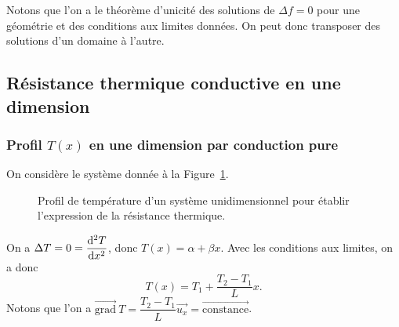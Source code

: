         Notons que l'on a le théorème d'unicité des solutions de $\Delta f=0$ pour une géométrie et des conditions aux limites données. On peut donc transposer des solutions d'un domaine à l'autre.

    \subsection{Résistance thermique conductive en une dimension}
        \subsubsection{Profil $T(x)$ en une dimension par conduction pure}

            On considère le système donnée à la Figure~\ref{fig:resistance_thermique_conductive_1d}.
            \begin{figure}
                \centering
                \caption{Profil de température d'un système unidimensionnel pour établir l'expression de la résistance thermique.}    
                \label{fig:resistance_thermique_conductive_1d}
            \end{figure}

            On a $\Delta T=0=\dfrac{\mathrm{d}^{2}T}{\mathrm{d} x^{2}}$, donc $T(x)=\alpha+\beta x$. Avec les conditions aux limites, on a donc
            \begin{equation}
                T(x)=T_1+\frac{T_2-T_1}{L}x.
            \end{equation}
            Notons que l'on a $\vec{\mathrm{grad}}~T=\dfrac{T_2-T_1}{L}\vec{u_x}=\vec{\mathrm{constance}}$.

